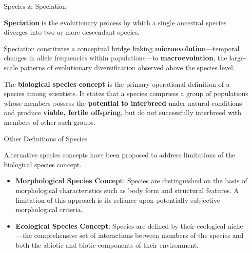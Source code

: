 \documentclass[10pt]{article}
\begin{document}
    \begin{core}[label=core:speciation]{Species \& Speciation}

      \textbf{Speciation} is the evolutionary process by which a single ancestral species diverges into two or more descendant species.

      Speciation constitutes a conceptual bridge linking \textbf{microevolution}---temporal changes in allele frequencies within populations---to \textbf{macroevolution}, the large-scale patterns of evolutionary diversification observed above the species level.

      The \textbf{biological species concept} is the primary operational definition of a species among scientists. It states that a species comprises a group of populations whose members possess the \textbf{potential to interbreed} under natural conditions and produce \textbf{viable, fertile offspring}, but do not successfully interbreed with members of other such groups.

    \end{core}

    \begin{core}{Other Definitions of Species}

      Alternative species concepts have been proposed to address limitations of the biological species concept.

      \begin{itemize}

        \item \textbf{Morphological Species Concept}: Species are distinguished on the basis of morphological characteristics such as body form and structural features. A limitation of this approach is its reliance upon potentially subjective morphological criteria.

        \item \textbf{Ecological Species Concept}: Species are defined by their ecological niche---the comprehensive set of interactions between members of the species and both the abiotic and biotic components of their environment.

      \end{itemize}

    \end{core}
\end{document}
